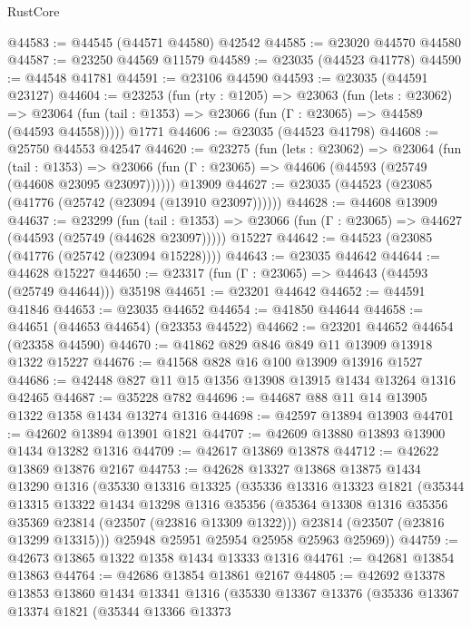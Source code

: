 \begin{lexlean}{RustCore}
\begin{coremodule}
@44583 := @44545 (@44571 @44580) @42542
@44585 := @23020 @44570 @44580
@44587 := @23250 @44569 @11579
@44589 := @23035 (@44523 @41778)
@44590 := @44548 @41781
@44591 := @23106 @44590
@44593 := @23035 (@44591 @23127)
@44604 := @23253
    (fun (rty : @1205) =>
    @23063
      (fun (lets : @23062) =>
      @23064 (fun (tail : @1353) => @23066 (fun (Γ : @23065) => @44589 (@44593 @44558)))))
    @1771
@44606 := @23035 (@44523 @41798)
@44608 := @25750 @44553 @42547
@44620 := @23275
    (fun (lets : @23062) =>
    @23064
      (fun (tail : @1353) =>
      @23066 (fun (Γ : @23065) => @44606 (@44593 (@25749 (@44608 @23095 @23097))))))
    @13909
@44627 := @23035 (@44523 (@23085 (@41776 (@25742 (@23094 (@13910 @23097))))))
@44628 := @44608 @13909
@44637 := @23299
    (fun (tail : @1353) => @23066 (fun (Γ : @23065) => @44627 (@44593 (@25749 (@44628 @23097)))))
    @15227
@44642 := @44523 (@23085 (@41776 (@25742 (@23094 @15228))))
@44643 := @23035 @44642
@44644 := @44628 @15227
@44650 := @23317 (fun (Γ : @23065) => @44643 (@44593 (@25749 @44644))) @35198
@44651 := @23201 @44642
@44652 := @44591 @41846
@44653 := @23035 @44652
@44654 := @41850 @44644
@44658 := @44651 (@44653 @44654) (@23353 @44522)
@44662 := @23201 @44652 @44654 (@23358 @44590)
@44670 := @41862 @829 @846 @849 @11 @13909 @13918 @1322 @15227
@44676 := @41568 @828 @16 @100 @13909 @13916 @1527
@44686 := @42448 @827 @11 @15 @1356 @13908 @13915 @1434 @13264 @1316 @42465
@44687 := @35228 @782
@44696 := @44687 @88 @11 @14 @13905 @1322 @1358 @1434 @13274 @1316
@44698 := @42597 @13894 @13903
@44701 := @42602 @13894 @13901 @1821
@44707 := @42609 @13880 @13893 @13900 @1434 @13282 @1316
@44709 := @42617 @13869 @13878
@44712 := @42622 @13869 @13876 @2167
@44753 := @42628
    @13327
    @13868
    @13875
    @1434
    @13290
    @1316
    (@35330
      @13316
      @13325
      (@35336
        @13316
        @13323
        @1821
        (@35344
          @13315
          @13322
          @1434
          @13298
          @1316
          @35356
          (@35364 @13308 @1316 @35356 @35369 @23814 (@23507 (@23816 @13309 @1322)))
          @23814
          (@23507 (@23816 @13299 @13315)))
        @25948
        @25951
        @25954
        @25958
        @25963
        @25969))
@44759 := @42673 @13865 @1322 @1358 @1434 @13333 @1316
@44761 := @42681 @13854 @13863
@44764 := @42686 @13854 @13861 @2167
@44805 := @42692
    @13378
    @13853
    @13860
    @1434
    @13341
    @1316
    (@35330
      @13367
      @13376
      (@35336
        @13367
        @13374
        @1821
        (@35344
          @13366
          @13373

\end{coremodule}
\end{lexlean}
